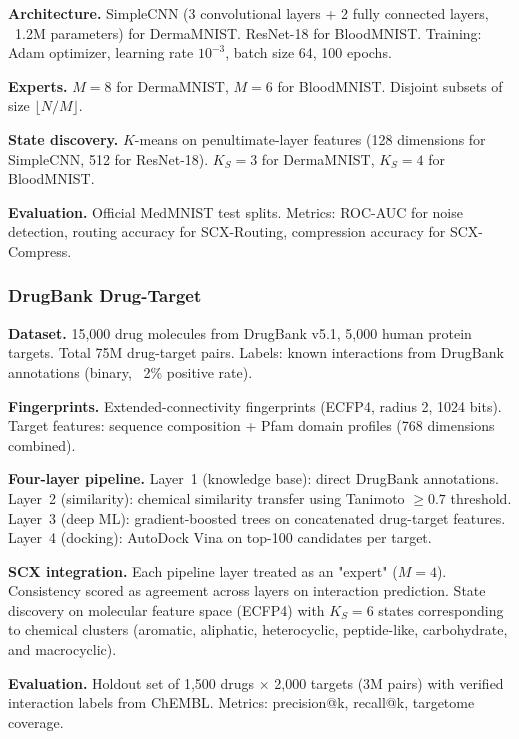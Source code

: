 \textbf{Architecture.} SimpleCNN (3 convolutional layers + 2 fully connected layers, ~1.2M parameters) for DermaMNIST. ResNet-18 for BloodMNIST. Training: Adam optimizer, learning rate $10^{-3}$, batch size 64, 100 epochs.

\textbf{Experts.} $M = 8$ for DermaMNIST, $M = 6$ for BloodMNIST. Disjoint subsets of size $\lfloor N/M\rfloor$.

\textbf{State discovery.} $K$-means on penultimate-layer features (128 dimensions for SimpleCNN, 512 for ResNet-18). $K_S = 3$ for DermaMNIST, $K_S = 4$ for BloodMNIST.

\textbf{Evaluation.} Official MedMNIST test splits. Metrics: ROC-AUC for noise detection, routing accuracy for SCX-Routing, compression accuracy for SCX-Compress.

\subsubsection{DrugBank Drug-Target}
\textbf{Dataset.} 15,000 drug molecules from DrugBank v5.1, 5,000 human protein targets. Total 75M drug-target pairs. Labels: known interactions from DrugBank annotations (binary, ~2\% positive rate).

\textbf{Fingerprints.} Extended-connectivity fingerprints (ECFP4, radius 2, 1024 bits). Target features: sequence composition + Pfam domain profiles (768 dimensions combined).

\textbf{Four-layer pipeline.} Layer~1 (knowledge base): direct DrugBank annotations. Layer~2 (similarity): chemical similarity transfer using Tanimoto $\geq 0.7$ threshold. Layer~3 (deep ML): gradient-boosted trees on concatenated drug-target features. Layer~4 (docking): AutoDock Vina on top-100 candidates per target.

\textbf{SCX integration.} Each pipeline layer treated as an "expert" ($M = 4$). Consistency scored as agreement across layers on interaction prediction. State discovery on molecular feature space (ECFP4) with $K_S = 6$ states corresponding to chemical clusters (aromatic, aliphatic, heterocyclic, peptide-like, carbohydrate, and macrocyclic).

\textbf{Evaluation.} Holdout set of 1,500 drugs $\times$ 2,000 targets (3M pairs) with verified interaction labels from ChEMBL. Metrics: precision@k, recall@k, targetome coverage.


